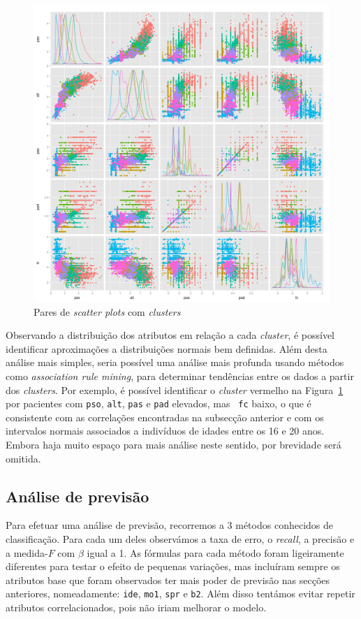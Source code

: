 \documentclass[10pt, conference, compsocconf]{IEEEtran}
\begin{document}
\begin{figure}[!ht]
  \centering
  \includegraphics[scale=0.5]{img/amv_kmsm.png}
  \caption{Pares de \textit{scatter plots} com \textit{clusters}}
  \label{fig:amksm}
\end{figure}

Observando a distribuição dos atributos em relação a cada
\textit{cluster}, é possível identificar aproximações a distribuições
normais bem definidas. Além desta análise mais simples, seria possível
uma análise mais profunda usando métodos como \textit{association rule
  mining}, para determinar tendências entre os dados a partir dos
\textit{clusters}. Por exemplo, é possível identificar o
\textit{cluster} vermelho na Figura~\ref{fig:amksm} por pacientes com
       {\tt pso}, {\tt alt}, {\tt pas} e {\tt pad} elevados, mas {\tt
         fc} baixo, o que é consistente com as correlações encontradas
       na subsecção anterior e com os intervalos normais associados a
       indivíduos de idades entre os 16 e 20 anos. Embora haja muito
       espaço para mais análise neste sentido, por brevidade será
       omitida.


\subsection{Análise de previsão}
Para efetuar uma análise de previsão, recorremos a 3 métodos
conhecidos de classificação. Para cada um deles observámos a taxa de
erro, o \textit{recall}, a precisão e a medida-$F$ com $\beta$ igual a
1. As fórmulas para cada método foram ligeiramente diferentes para
testar o efeito de pequenas variações, mas incluíram sempre os
atributos base que foram observados ter mais poder de previsão nas
secções anteriores, nomeadamente: {\tt ide}, {\tt mo1}, {\tt spr} e
{\tt b2}. Além disso tentámos evitar repetir atributos
correlacionados, pois não iriam melhorar o modelo.
\end{document}
